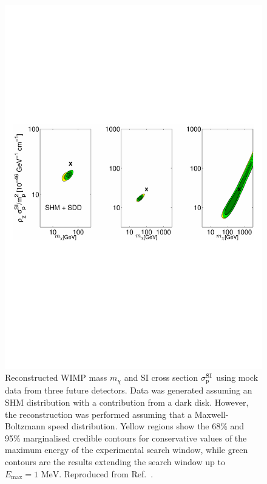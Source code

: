 \begin{figure}[ht!]
  \includegraphics[trim={0cm 9cm 0cm 9cm},clip,width=\textwidth]{Speed/PeterRecon.pdf}
  \caption[Biased reconstruction of WIMP parameters]{Reconstructed WIMP mass $m_\chi$ and SI cross section $\sigmapsi$ using mock data from three future detectors. Data was generated assuming an SHM distribution with a contribution from a dark disk. However, the reconstruction was performed assuming that a Maxwell-Boltzmann speed distribution. Yellow regions show the 68\% and 95\% marginalised credible contours for conservative values of the maximum energy of the experimental search window, while green contours are the results extending the search window up to $E_\textrm{max} = 1 \textrm{ MeV}$. Reproduced from Ref.~\cite{Peter:2011}.}
  \label{fig:Speed:PeterRecon}
\end{figure}

